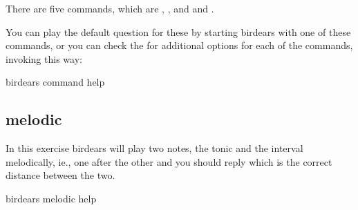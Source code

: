 \documentclass[letterpaper,10pt,english]{sphinxmanual}
\begin{document}
There are five commands, which are , ,  and
 and .

You can play the default question for these by starting birdears with one of
these commands, or you can check the  for additional options for each
of the commands, invoking this way:

\begin{sphinxVerbatim}[commandchars=\\\{\}]
birdears \PYGZlt{}command\PYGZgt{} \PYGZhy{}\PYGZhy{}help
\end{sphinxVerbatim}


\subsection{melodic}
\label{\detokenize{using:melodic}}
In this exercise birdears will play two notes, the tonic and the interval
melodically, ie., one after the other and you should reply which is the
correct distance between the two.

\begin{sphinxVerbatim}[commandchars=\\\{\}]
birdears melodic \PYGZhy{}\PYGZhy{}help
\end{sphinxVerbatim}
\end{document}
